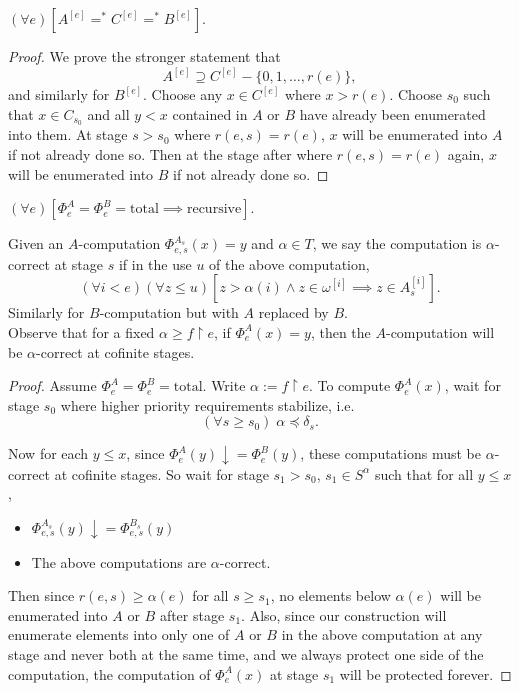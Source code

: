   \begin{lemma}
    $(\forall e) [A^{[e]}=^*C^{[e]}=^*B^{[e]}]$.
  \end{lemma}
  \begin{proof}
    We prove the stronger statement that
    \[A^{[e]}\supseteq C^{[e]}-\{0,1,\ldots,r(e)\},\]
    and similarly for $B^{[e]}$. Choose any $x\in C^{[e]}$ where $x>r(e)$.
    Choose $s_0$ such that $x\in C_{s_0}$ and all $y<x$ contained in $A$ or
    $B$ have already been enumerated into them. At stage $s>s_0$ where
    $r(e,s)=r(e)$, $x$ will be enumerated into $A$ if not already done so.
    Then at the stage after where $r(e,s)=r(e)$ again, $x$ will be
    enumerated into $B$ if not already done so.
  \end{proof}

  \begin{lemma}
    $(\forall e)[\Phi_e^A=\Phi_e^B=\text{total} \implies\text{recursive}]$.
  \end{lemma}

  \begin{notation}
    Given an $A$-computation $\Phi_{e,s}^{A_s}(x)=y$ and $\alpha\in T$, we
    say the computation is $\alpha$-correct at stage $s$ if in the use $u$ of
    the above computation,
    \[(\forall i<e)(\forall z\leq u) [z>\alpha(i) \wedge z\in \omega^{[i]}
    \implies z\in A_s^{[i]}].\]
    Similarly for $B$-computation but with $A$ replaced by $B$. \\

    Observe that for a fixed $\alpha\geq f\restriction e$, if
    $\Phi_e^A(x)=y$, then the $A$-computation will be $\alpha$-correct at
    cofinite stages.
  \end{notation}

  \begin{proof}
    Assume $\Phi_e^A=\Phi_e^B=\text{total}$. Write $\alpha:=f\restriction
    e$. To compute $\Phi_e^A(x)$, wait for stage $s_0$ where higher
    priority requirements stabilize, i.e.
    \[(\forall s\geq s_0)\; \alpha\preceq\delta_s.\]

    Now for each $y\leq x$, since $\Phi_e^A(y) \downarrow=\Phi_e^B(y)$,
    these computations must be $\alpha$-correct at cofinite stages. So wait
    for stage $s_1>s_0$, $s_1\in S^\alpha$ such that for all $y\leq x$,
    \begin{itemize}
      \item $\Phi_{e,s}^{A_s}(y) \downarrow=\Phi_{e,s}^{B_s}(y)$
      \item The above computations are $\alpha$-correct.
    \end{itemize}

    Then since $r(e,s)\geq \alpha(e)$ for all $s\geq s_1$, no elements
    below $\alpha(e)$ will be enumerated into $A$ or $B$ after stage $s_1$.
    Also, since our construction will enumerate elements into only one of
    $A$ or $B$ in the above computation at any stage and never both at the
    same time, and we always protect one side of the computation, the
    computation of $\Phi_e^A(x)$ at stage $s_1$ will be protected forever.
  \end{proof}
